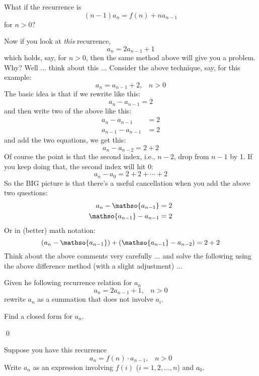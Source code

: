\newpage
\begin{ex}
  What if the recurrence is
\[
(n-1)a_n = f(n) + n a_{n-1}
\]
for $n > 0$?  
\end{ex}

\newpage
Now if you look at \textit{this} recurrence,
\[
a_n = 2 a_{n-1} + 1
\]
which holds, say, for $n > 0$, then
the same method above will give you a problem.
Why?
Well ... think about this ...
Consider the above technique, say, for this example:
\[
a_n = a_{n-1} + 2, \,\,\,\,\, n > 0
\]
The basic idea is that if we rewrite like this:
\[
a_n - a_{n-1} = 2
\]
and then write two of the above like this:
\begin{align*}
a_n - a_{n-1}     &= 2 \\
a_{n-1} - a_{n-1} &= 2 
\end{align*}
and add the two equations, we get this:
\[
a_n - a_{n-2} = 2 + 2 
\]
Of course the point is that the second index, i.e., $n-2$,
drop from $n-1$ by 1.
If you keep doing that, the second index will hit $0$:
\[
a_n - a_0 = 2 + 2 + \cdots + 2 
\]
So the BIG picture is that there's a useful cancellation when you add
the above two questions:
\begin{align*}
a_n - \mathso{a_{n-1}}     &= 2 \\
\mathso{a_{n-1}} - a_{n-1} &= 2 
\end{align*}
Or in (better) math notation:
\[
(a_n - \mathso{a_{n-1}}) + (\mathso{a_{n-1}} - a_{n-2}) = 2 + 2
\]
Think about the above comments very carefully ... and solve
the following using the above difference method (with a slight adjustment) ...


\newpage
\begin{ex}
  \begin{tightlist}
    \item Given he following recurrence relation for $a_n$
    \[
    a_n = 2 a_{n-1} + 1, \,\,\,\,\, n > 0
    \]
    rewrite $a_n$ as a summation that does not involve $a_i$.
    \item Find a closed form for $a_n$.
  \end{tightlist}
\qed
\end{ex}

\newpage


\begin{ex}
Suppose you have this recurrence
\[
a_n = f(n) \cdot a_{n-1}, \,\,\,\,\, n > 0
\]
Write $a_n$ as an expression involving $f(i)$ ($i = 1, 2, ..., n$)
and $a_0$.
\end{ex}

\SOLUTION

